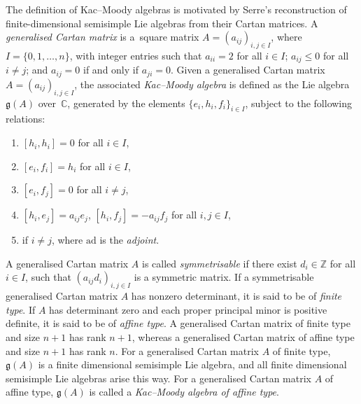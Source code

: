 \documentclass[pdftex]{sigma}
\numberwithin{equation}{section}
\theoremstyle{definition}
\newcommand{\Z}{\mathbb{Z}}
\begin{document}
The definition of Kac--Moody algebras is motivated by Serre's reconstruction of finite-dimen\-sional semisimple Lie algebras from their Cartan matrices. A \emph{generalised Cartan matrix} is a~square matrix $A = (a_{ij})_{i,j \in I}$, where $I = \{0, 1, \ldots, n\}$, with integer entries such that $a_{ii} = 2$ for all $i \in I$; $a_{ij} \leq 0$ for all $i \neq j$; and $a_{ij} = 0$ if and only if $a_{ji} = 0$. Given a generalised Cartan matrix $A = (a_{ij})_{i,j \in I}$, the associated \emph{Kac--Moody algebra} is defined as the Lie algebra~$\mathfrak{g}(A)$ over~$\mathbb{C}$, generated by the elements $\{e_i, h_i, f_i\}_{i \in I}$, subject to the following relations:
\begin{enumerate}[label=(\roman*)]\itemsep=0pt
 \item $[h_i,h_i] =0$ for all $i \in I$,
 \item $[e_i,f_i] =h_i$ for all $i \in I$,
 \item $[e_i,f_j] =0$ for all $i \neq j$,
 \item $[h_i,e_j] =a_{ij}e_j$, $[h_i,f_j] =-a_{ij}f_j$ for all $i,j \in I$,
 \item {} if $i \neq j$, where $\mathrm{ad}$ is the \textit{adjoint}.
\end{enumerate}

A generalised Cartan matrix $A$ is called \emph{symmetrisable} if there exist $d_i \in \Z$ for all $i \in I$, such that $(a_{ij}d_i)_{i,j \in I}$ is a symmetric matrix. If a symmetrisable generalised Cartan matrix $A$ has nonzero determinant, it is said to be of \emph{finite type}. If $A$ has determinant zero and each proper principal minor is positive definite, it is said to be of \emph{affine type}. A generalised Cartan matrix of finite type and size $n+1$ has rank $n+1$, whereas a generalised Cartan matrix of affine type and size $n+1$ has rank $n$. For a generalised Cartan matrix $A$ of finite type, $\mathfrak{g}(A)$ is a finite dimensional semisimple Lie algebra, and all finite dimensional semisimple Lie algebras arise this way. For a generalised Cartan matrix $A$ of affine type, $\mathfrak{g}(A)$ is called a \emph{Kac--Moody algebra of affine type}.
\end{document}
